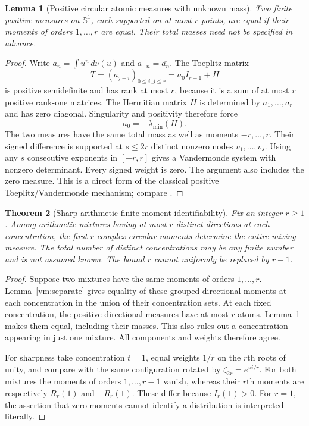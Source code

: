 \documentclass[11pt]{article}
\newtheorem{theorem}{Theorem}[section]
\newtheorem{lemma}[theorem]{Lemma}
\theoremstyle{definition}
\theoremstyle{remark}
\newcommand{\Sone}{\mathbb S^1}
\begin{document}
\begin{lemma}[Positive circular atomic measures with unknown mass]
\label{vm:toeplitz}
Two finite positive measures on $\Sone$, each supported on at most $r$
points, are equal if their moments of orders $1,\ldots,r$ are equal.
Their total masses need not be specified in advance.
\end{lemma}
\begin{proof}
Write $a_n=\int u^n\,d\nu(u)$ and $a_{-n}=\overline{a_n}$.
The Toeplitz matrix
\[
 T=(a_{j-i})_{0\leq i,j\leq r}=a_0I_{r+1}+H
\]
is positive semidefinite and has rank at most $r$, because it is a sum
of at most $r$ positive rank-one matrices.  The Hermitian matrix $H$
is determined by $a_1,\ldots,a_r$ and has zero diagonal.  Singularity
and positivity therefore force
\[
 a_0=-\lambda_{\min}(H).
\]
The two measures have the same total mass as well as moments
$-r,\ldots,r$.  Their signed difference is supported at $s\leq2r$
distinct nonzero nodes $v_1,\ldots,v_s$.  Using any $s$ consecutive
exponents in $[-r,r]$ gives a Vandermonde system with nonzero
determinant.  Every signed weight is zero.
The argument also includes the zero measure.  This is a direct form
of the classical positive Toeplitz/Vandermonde mechanism; compare
\cite{YX}.
\end{proof}

\begin{theorem}[Sharp arithmetic finite-moment identifiability]
\label{vm:sharp}
Fix an integer $r\geq1$.  Among arithmetic mixtures having at most
$r$ distinct directions at each concentration, the first $r$ complex
circular moments determine the entire mixing measure.  The total number
of distinct concentrations may be any finite number and is not assumed
known.  The bound $r$ cannot uniformly be replaced by $r-1$.
\end{theorem}
\begin{proof}
Suppose two mixtures have the same moments of orders $1,\ldots,r$.
Lemma~\ref{vm:separate} gives equality of these grouped directional
moments at each concentration in the union of their concentration
sets.  At each fixed concentration, the positive directional measures
have at most $r$ atoms.  Lemma~\ref{vm:toeplitz} makes them equal,
including their masses.  This also rules out a concentration appearing
in just one mixture.  All components and weights therefore agree.

For sharpness take concentration $t=1$, equal weights $1/r$ on the
$r$th roots of unity, and compare with the same configuration rotated
by $\zeta_{2r}=e^{\pi i/r}$.  For both mixtures the moments of orders
$1,\ldots,r-1$ vanish, whereas their $r$th moments are respectively
$R_r(1)$ and $-R_r(1)$.  These differ because $I_r(1)>0$.
For $r=1$, the assertion that zero moments cannot identify a distribution
is interpreted literally.
\end{proof}
\end{document}
